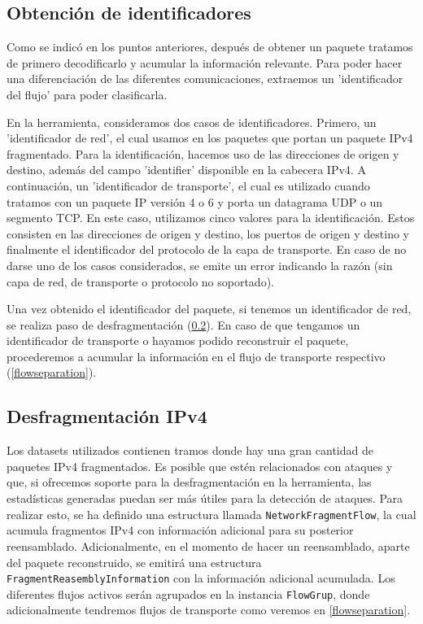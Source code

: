 \subsection{Obtención de identificadores} \label{idextraction}

Como se indicó en los puntos anteriores, después de obtener un paquete tratamos de primero decodificarlo y acumular la información relevante. Para poder hacer una diferenciación de las diferentes comunicaciones, extraemos un 'identificador del flujo' para poder clasificarla.

En la herramienta, consideramos dos casos de identificadores. Primero, un 'identificador de red', el cual usamos en los paquetes que portan un paquete IPv4 fragmentado. Para la identificación, hacemos uso de las direcciones de origen y destino, además del campo 'identifier' disponible en la cabecera IPv4. A continuación, un 'identificador de transporte', el cual es utilizado cuando tratamos con un paquete IP versión 4 o 6 y porta un datagrama UDP o un segmento TCP. En este caso, utilizamos cinco valores para la identificación. Estos consisten en las direcciones de origen y destino, los puertos de origen y destino y finalmente el identificador del protocolo de la capa de transporte. En caso de no darse uno de los casos considerados, se emite un error indicando la razón (sin capa de red, de transporte o protocolo no soportado).

Una vez obtenido el identificador del paquete, si tenemos un identificador de red, se realiza paso de desfragmentación (\ref{ipv4defrag}). En caso de que tengamos un identificador de transporte o hayamos podido reconstruir el paquete, procederemos a acumular la información en el flujo de transporte respectivo (\ref{flowseparation}).

\subsection{Desfragmentación IPv4} \label{ipv4defrag}

Los datasets utilizados contienen tramos donde hay una gran cantidad de paquetes IPv4 fragmentados. Es posible que estén relacionados con ataques y que, si ofrecemos soporte para la desfragmentación en la herramienta, las estadísticas generadas puedan ser más útiles para la detección de ataques. Para realizar esto, se ha definido una estructura llamada \texttt{NetworkFragmentFlow}, la cual acumula fragmentos IPv4 con información adicional para su posterior reensamblado. Adicionalmente, en el momento de hacer un reensamblado, aparte del paquete reconstruido, se emitirá una estructura \texttt{FragmentReasemblyInformation} con la información adicional acumulada. Los diferentes flujos activos serán agrupados en la instancia \texttt{FlowGrup}, donde adicionalmente tendremos flujos de transporte como veremos en \ref{flowseparation}.

